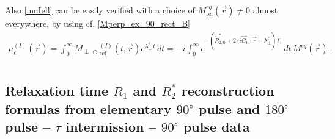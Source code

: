 \documentclass{ws-m3as}
\def\Mpp{M_{\perp\!\!\!\!\!\bigcirc}}
\begin{document}
\begin{remark}
Also \eqref{muIell} can be easily verified with a choice of $M^{eq}_{\text{ref}}(\vec r)\not=0$ almost everywhere, by using cf. \eqref{Mperp_ex_90_rect_B}
\[
\begin{aligned}
\mu_\ell^{(I)}(\vec r)
=\int_0^\infty{\Mpp}_{\text{ref}}^{(I)}(t,\vec r)e^{\lambda_\perp^\ell\,t}\,dt
=-i\int_0^\infty e^{-(\tilde{R}_{2,0}^*+2\pi i {\vec G}_0\cdot{\vec r}+\lambda_\perp^\ell)\,t)}\,dt
\,M^{eq}(\vec r).
\end{aligned}
\]


\end{remark}

%
\appendix
\section{}
\subsection{Relaxation time $R_1$ and $R_2^*$ reconstruction formulas from elementary $90{}^{\circ}$ pulse and $180{}^{\circ}$ pulse -- $\tau$ intermission -- $90{}^{\circ}$ pulse data}
\label{sec:appendix_reconR1R2} 
\end{document}
